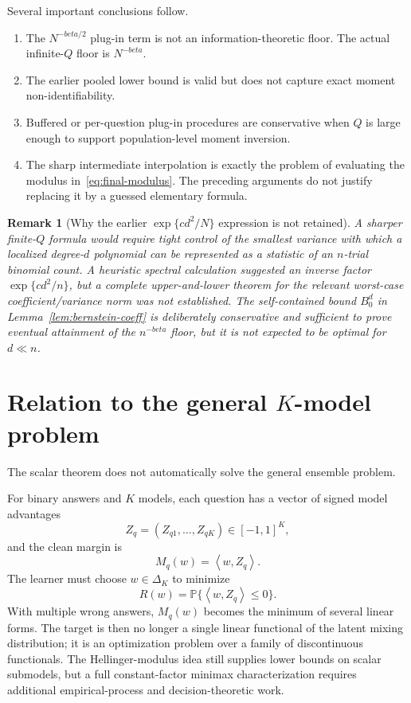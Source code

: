 \documentclass[11pt]{article}
\def\beta{beta}%
\newtheorem{remark}[theorem]{Remark}
\newcommand{\Pp}{\mathbb P}
\newcommand{\inner}[2]{\left\langle#1,#2\right\rangle}
\begin{document}
Several important conclusions follow.

\begin{enumerate}[label=(\arabic*)]
\item The $N^{-\beta/2}$ plug-in term is not an information-theoretic floor.  The actual infinite-$Q$ floor is $N^{-\beta}$.
\item The earlier pooled lower bound is valid but does not capture exact moment non-identifiability.
\item Buffered or per-question plug-in procedures are conservative when $Q$ is large enough to support population-level moment inversion.
\item The sharp intermediate interpolation is exactly the problem of evaluating the modulus in~\eqref{eq:final-modulus}.  The preceding arguments do not justify replacing it by a guessed elementary formula.
\end{enumerate}

\begin{remark}[Why the earlier $\exp\{c d^2/N\}$ expression is not retained]
A sharper finite-$Q$ formula would require tight control of the smallest variance with which a localized degree-$d$ polynomial can be represented as a statistic of an $n$-trial binomial count.  A heuristic spectral calculation suggested an inverse factor $\exp\{c d^2/n\}$, but a complete upper-and-lower theorem for the relevant worst-case coefficient/variance norm was not established.  The self-contained bound $B_0^d$ in Lemma~\ref{lem:bernstein-coeff} is deliberately conservative and sufficient to prove eventual attainment of the $n^{-\beta}$ floor, but it is not expected to be optimal for $d\ll n$.
\end{remark}

\section{Relation to the general $K$-model problem}

The scalar theorem does not automatically solve the general ensemble problem.

For binary answers and $K$ models, each question has a vector of signed model advantages
\[
Z_q=(Z_{q1},\dots,Z_{qK})\in[-1,1]^K,
\]
and the clean margin is
\[
M_q(w)=\inner{w}{Z_q}.
\]
The learner must choose $w\in\Delta_K$ to minimize
\[
R(w)=\Pp\{\inner{w}{Z_q}\le0\}.
\]
With multiple wrong answers, $M_q(w)$ becomes the minimum of several linear forms.  The target is then no longer a single linear functional of the latent mixing distribution; it is an optimization problem over a family of discontinuous functionals.  The Hellinger-modulus idea still supplies lower bounds on scalar submodels, but a full constant-factor minimax characterization requires additional empirical-process and decision-theoretic work.
\end{document}
